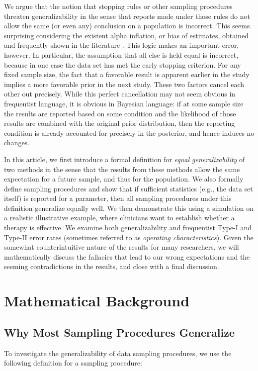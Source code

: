 \documentclass[man]{apa7}\usepackage[]{graphicx}\usepackage[]{xcolor}
\theoremstyle{definition}
\begin{document}
We argue that the notion that stopping rules or other sampling procedures threaten generalizability in the sense that reports made under those rules do not allow the same (or even any) conclusion on a population is incorrect.  This seems surprising considering the existent alpha inflation, or bias of estimates, obtained and frequently shown in the literature \parencite{ioannidis2005most}. This logic makes an important error, however.  In particular, the assumption that all else is held equal is incorrect, because in one case the data set has met the early stopping criterion.  For any fixed sample size, the fact that a favorable result is apparent earlier in the study implies a more favorable prior in the next study.  These two factors cancel each other out precisely.  While this perfect cancellation may not seem obvious in frequentist language, it is obvious in Bayesian language: if at some sample size the results are reported based on some condition and the likelihood of those results are combined with the original prior distribution, then the reporting condition is already accounted for precisely in the posterior, and hence induces no changes. 

In this article, we first introduce a formal definition for \textit{equal generalizability} of two methods in the sense that the results from these methods allow the same expectation for a future sample, and thus for the population.  We also formally define sampling procedures and show that if sufficient statistics (e.g., the data set itself) is reported for a parameter, then all sampling procedures under this definition generalize equally well. We then demonstrate this using a simulation on a realistic illustrative example, where clinicians want to establish whether a therapy is effective.  We examine both generalizability and frequentist Type-I and Type-II error rates (sometimes referred to as \textit{operating characteristics}).  Given the somewhat counterintuitive nature of the results for many researchers, we will mathematically discuss the fallacies that lead to our wrong expectations and the seeming contradictions in the results, and close with a final discussion. 

\section{Mathematical Background}
\subsection{Why Most Sampling Procedures Generalize}
To investigate the generalizability of data sampling procedures, we use the following definition for a sampling procedure:
\end{document}
